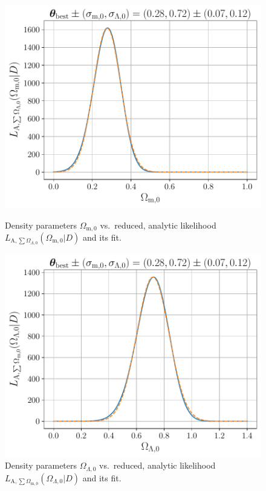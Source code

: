 \begin{figure}[H]
   \begin{minipage}{8cm}
      \centering
      \includegraphics[scale=0.52]{figures/plots/PDF/Lambda-CDM-analytic-likelihood_Omega-m0-vs-likelihood-summed-Omega-Lambda0.pdf}
      \caption{Density parameters $\Omega_{\text{m},0}$ vs.\ reduced, analytic likelihood $L_{\text{A}, \sum \Omega_{\Lambda,0}}(\Omega_{\text{m},0} \vert D)$ and its fit.}
      \label{fig:Lambda-CDM-analytic-likelihood_Omega-m0-vs-likelihood-summed-Omega-Lambda0}
   \end{minipage}
   \hspace*{1cm}
   \begin{minipage}{8cm}
      \centering
      \includegraphics[scale=0.52]{figures/plots/PDF/Lambda-CDM-analytic-likelihood_Omega-Lambda0-vs-likelihood-summed-Omega-m0.pdf}
      \caption{Density parameters $\Omega_{\Lambda,0}$ vs.\ reduced, analytic likelihood $L_{\text{A}, \sum \Omega_{\text{m},0}}(\Omega_{\Lambda,0} \vert D)$ and its fit.}
      \label{fig:Lambda-CDM-analytic-likelihood_Omega-Lambda0-vs-likelihood-summed-Omega-m0}
   \end{minipage}
\end{figure}

